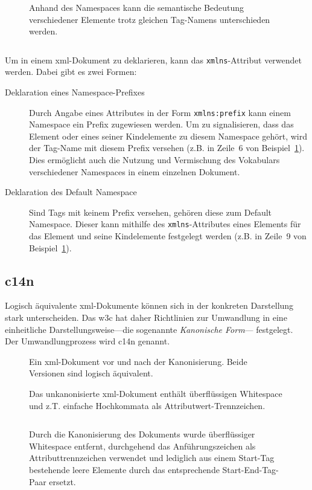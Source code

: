 \begin{figure}[h]
    \begin{example}
        \label{ex:xmlns}
        Anhand des Namespaces kann die semantische Bedeutung verschiedener Elemente trotz gleichen Tag-Namens unterschieden werden.
        \inputminted[firstline=2,firstnumber=1]{xml}{ex-xmlns.xml}
    \end{example}
\end{figure}

Um in einem \acrshort{xml}-Dokument zu deklarieren, kann das \texttt{xmlns}-Attribut verwendet werden. Dabei gibt es zwei Formen:

\begin{description}
    \item[Deklaration eines Namespace-Prefixes] Durch Angabe eines Attributes in der Form \texttt{xmlns:prefix} kann einem Namespace ein Prefix zugewiesen werden. Um zu signalisieren, dass das Element oder eines seiner Kindelemente zu diesem Namespace gehört, wird der Tag-Name mit diesem Prefix versehen (z.B. in Zeile~6 von Beispiel~\ref{ex:xmlns}). Dies ermöglicht auch die Nutzung und Vermischung des Vokabulars verschiedener Namespaces in einem einzelnen Dokument.
    \item[Deklaration des Default Namespace] Sind Tags mit keinem Prefix versehen, gehören diese zum Default Namespace. Dieser kann mithilfe des \texttt{xmlns}-Attributes eines Elements für das Element und seine Kindelemente festgelegt werden (z.B. in Zeile~9 von Beispiel~\ref{ex:xmlns}).
\end{description}

\subsection{\acrfull{c14n}}
\label{sec:c14n}

Logisch äquivalente \acrshort{xml}-Dokumente können sich in der konkreten Darstellung
stark unterscheiden. Das \gls{w3c} hat daher Richtlinien zur Umwandlung in eine
einheitliche Darstellungsweise---die sogenannte \emph{Kanonische Form}---
festgelegt. Der Umwandlungprozess wird \acrfull{c14n} genannt.~\cite{c14n}

\begin{figure}[h!]
\begin{example}[Kanonisierung]
    \label{ex:c14n}
    Ein \acrshort{xml}-Dokument vor und nach der Kanonisierung. Beide Versionen sind
    logisch äquivalent.

    Das unkanonisierte \acrshort{xml}-Dokument enthält überflüssigen Whitespace und z.T. einfache Hochkommata als Attributwert-Trennzeichen.
    \inputminted{xml}{ex-c14n-pre.xml}
    Durch die Kanonisierung des Dokuments wurde überflüssiger Whitespace entfernt, durchgehend das Anführungszeichen als Attributtrennzeichen verwendet und lediglich aus einem Start-Tag bestehende leere Elemente durch das entsprechende Start-End-Tag-Paar ersetzt.
    \inputminted{xml}{ex-c14n-post.xml}
\end{example}
\end{figure}

